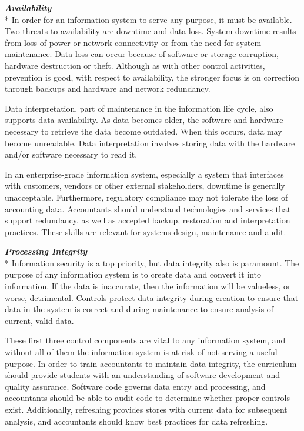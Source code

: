 \documentclass[12pt]{article}
\newcommand{\SubSubSection}[1]{{\centering{}\normalsize{}\textbf{\emph{#1}}}\\*\indent{}}
\begin{document}
\SubSubSection{Availability}
In order for an information system to serve any purpose, it must be available. Two threats to availability are downtime and data loss. System downtime results from loss of power or network connectivity or from the need for system maintenance. Data loss can occur because of software or storage corruption, hardware destruction or theft. Although as with other control activities, prevention is good, with respect to availability, the stronger focus is on correction through backups and hardware and network redundancy.

Data interpretation, part of maintenance in the information life cycle, also supports data availability. As data becomes older, the software and hardware necessary to retrieve the data become outdated. When this occurs, data may become unreadable. Data interpretation involves storing data with the hardware and/or software necessary to read it.

In an enterprise-grade information system, especially a system that interfaces with customers, vendors or other external stakeholders, downtime is generally unacceptable. Furthermore, regulatory compliance may not tolerate the loss of accounting data. Accountants should understand technologies and services that support redundancy, as well as accepted backup, restoration and interpretation practices. These skills are relevant for systems design, maintenance and audit.

\SubSubSection{Processing Integrity}
Information security is a top priority, but data integrity also is paramount. The purpose of any information system is to create data and convert it into information. If the data is inaccurate, then the information will be valueless, or worse, detrimental. Controls protect data integrity during creation to ensure that data in the system is correct and during maintenance to ensure analysis of current, valid data.

These first three control components are vital to any information system, and without all of them the information system is at risk of not serving a useful purpose. In order to train accountants to maintain data integrity, the curriculum should provide students with an understanding of software development and quality assurance. Software code governs data entry and processing, and accountants should be able to audit code to determine whether proper controls exist. Additionally, refreshing provides stores with current data for subsequent analysis, and accountants should know best practices for data refreshing.
\end{document}
